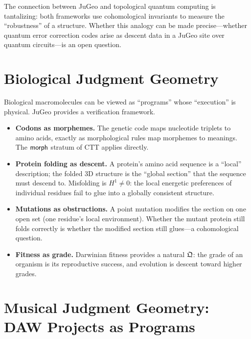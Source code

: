 \begin{remark}
The connection between JuGeo and topological quantum computing
is tantalizing: both frameworks use cohomological invariants to
measure the ``robustness'' of a structure.  Whether this analogy
can be made precise---whether quantum error correction codes
arise as descent data in a JuGeo site over quantum circuits---is
an open question.
\end{remark}

\section{Biological Judgment Geometry}
\label{sec:biological}

Biological macromolecules can be viewed as ``programs'' whose
``execution'' is physical.  JuGeo provides a verification framework.

\begin{itemize}
  \item \textbf{Codons as morphemes.}\;
        The genetic code maps nucleotide triplets to amino acids,
        exactly as morphological rules map morphemes to meanings.
        The $\mathsf{morph}$ stratum of CTT applies directly.
  \item \textbf{Protein folding as descent.}\;
        A protein's amino acid sequence is a ``local'' description;
        the folded 3D structure is the ``global section'' that the
        sequence must descend to.  Misfolding is $H^1 \neq 0$: the
        local energetic preferences of individual residues fail to
        glue into a globally consistent structure.
  \item \textbf{Mutations as obstructions.}\;
        A point mutation modifies the section on one open set
        (one residue's local environment).  Whether the mutant
        protein still folds correctly is whether the modified
        section still glues---a cohomological question.
  \item \textbf{Fitness as grade.}\;
        Darwinian fitness provides a natural $\mathfrak{Q}$: the grade
        of an organism is its reproductive success, and evolution
        is descent toward higher grades.
\end{itemize}

\section{Musical Judgment Geometry: DAW Projects as Programs}
\label{sec:musical}

